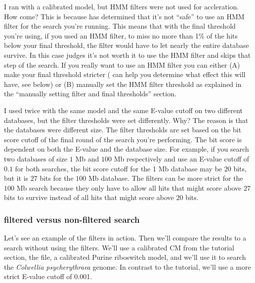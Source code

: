 \begin{srefaq}{I ran  with a calibrated model, but HMM
    filters were not used for accleration. How come?} This is because
     has determined that it's not ``safe'' to use
    an HMM filter for the search you're running. This means that with
    the final threshold you're using, if you used an HMM filter, 
    to miss no more than 1\% of the hits below your final threshold,
    the filter would have to let nearly the entire database
    survive. In this case  judges it's not worth it to
    use the HMM filter and skips that step of the search. If you
    really want to use an HMM filter you can either (A) make your
    final threshold stricter ( can help you determine 
    what effect this will have, see below) or (B) manually set the HMM
    filter threshold as explained in the ``manually setting filter
    and final thresholds'' section.
\end{srefaq}

\begin{srefaq}{I used  twice with the same model and
    the same E-value cutoff on two different databases, but the filter
    thresholds were set differently. Why?} The reason is that the
    databases were different size. The filter thresholds are set based
    on the bit score cutoff of the final round of the search you're
    performing. The bit score is dependent on both the E-value and the
    database size. For example, if you search two databases of size $1$
    Mb and $100$ Mb respectively and use an E-value cutoff of $0.1$ for both
    searches, the bit score cutoff for the 1 Mb database may be $20$
    bits, but it is $27$ bits for the $100$ Mb database. The filters
    can be more strict for the $100$ Mb search because they only have
    to allow all hits that might score above $27$ bits to
    survive instead of all hits that might score above $20$ bits. 
\end{srefaq}

\subsubsection{filtered versus non-filtered search}

Let's see an example of the filters in action. Then we'll compare the
results to a search without using the filters. We'll use a calibrated
CM from the tutorial section, the  file, a
calibrated Purine riboswitch model, and we'll use it to search the
\emph{Colwellia psycherythraea} genome. In contrast to the tutorial,
we'll use a more strict E-value cutoff of 0.001.

